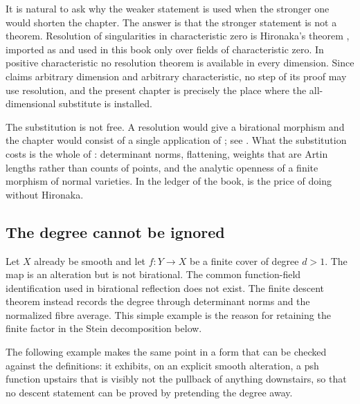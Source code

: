 \begin{remark}
\label{rem:ch42-resolution-status}
It is natural to ask why the weaker statement is used when the stronger one
would shorten the chapter.  The answer is that the stronger statement is not
a theorem.  Resolution of singularities in characteristic zero is Hironaka's
theorem \cite{Hironaka1964I,Hironaka1964II}, imported as
 and used in this book only over fields of
characteristic zero.  In positive characteristic no resolution theorem is
available in every dimension.  Since  claims
arbitrary dimension and arbitrary characteristic, no step of its proof may
use resolution, and the present chapter is precisely the place where the
all-dimensional substitute is installed.

The substitution is not free.  A resolution would give a birational morphism
and the chapter would consist of a single application of
; see
.  What the substitution costs is the
whole of : determinant norms, flattening,
weights that are Artin lengths rather than counts of points, and the
analytic openness of a finite morphism of normal varieties.  In the ledger
of the book,  is the price of doing without
Hironaka.
\end{remark}

\subsection{The degree cannot be ignored}
\label{sec:ch42-not-resolution}

\begin{example}
\label{ex:ch42-degree-matters}
Let $X$ already be smooth and let $f:Y\to X$ be a finite cover of degree
$d>1$.
The map is an alteration but is not birational.
The common function-field identification used in birational reflection does
not exist.
The finite descent theorem instead records the degree through determinant
norms and the normalized fibre average.
This simple example is the reason for retaining the finite factor in the
Stein decomposition below.
\end{example}

The following example makes the same point in a form that can be checked
against the definitions: it exhibits, on an explicit smooth alteration, a
psh function upstairs that is visibly not the pullback of anything
downstairs, so that no descent statement can be proved by pretending the
degree away.

